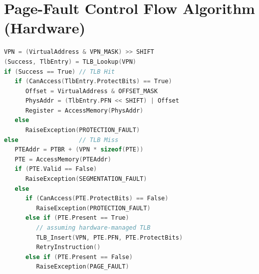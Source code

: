 \section*{Page-Fault Control Flow Algorithm (Hardware)}
\begin{minipage}{.72\linewidth}
\begin{lstlisting}[language=c]
VPN = (VirtualAddress & VPN_MASK) >> SHIFT
(Success, TlbEntry) = TLB_Lookup(VPN)
if (Success == True) // TLB Hit
   if (CanAccess(TlbEntry.ProtectBits) == True)
      Offset = VirtualAddress & OFFSET_MASK
      PhysAddr = (TlbEntry.PFN << SHIFT) | Offset
      Register = AccessMemory(PhysAddr)
   else
      RaiseException(PROTECTION_FAULT)
else                 // TLB Miss
   PTEAddr = PTBR + (VPN * sizeof(PTE))
   PTE = AccessMemory(PTEAddr)
   if (PTE.Valid == False)
      RaiseException(SEGMENTATION_FAULT)
   else
      if (CanAccess(PTE.ProtectBits) == False)
         RaiseException(PROTECTION_FAULT)
      else if (PTE.Present == True)
         // assuming hardware-managed TLB
         TLB_Insert(VPN, PTE.PFN, PTE.ProtectBits)
         RetryInstruction()
      else if (PTE.Present == False)
         RaiseException(PAGE_FAULT)
\end{lstlisting}
\end{minipage}
